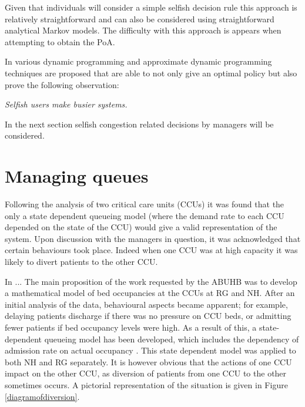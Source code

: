 \documentclass[a4paper,11pt]{article}
\begin{document}
Given that individuals will consider a simple selfish decision rule this approach is relatively straightforward and can also be considered using straightforward analytical Markov models.
The difficulty with this approach is appears when attempting to obtain the PoA.

In \cite{Shone2014} various dynamic programming and approximate dynamic programming techniques are proposed that are able to not only give an optimal policy but also prove the following observation:

\begin{center}
\textit{Selfish users make busier systems.}
\end{center}

In the next section selfish congestion related decisions by managers will be considered.

\section{Managing queues}\label{sec:managingqueues}

Following the analysis of two critical care units (CCUs) it was found that the only a state dependent queueing model (where the demand rate to each CCU depended on the state of the CCU) would give a valid representation of the system.
Upon discussion with the managers in question, it was acknowledged that certain behaviours took place.
Indeed when one CCU was at high capacity it was likely to divert patients to the other CCU.

In ...
The main proposition of the work requested by the ABUHB was to develop a mathematical model of bed occupancies at the CCUs at RG and NH.
After an initial analysis of the data, behavioural aspects became apparent; for example, delaying patients discharge if there was no pressure on CCU beds, or admitting fewer patients if bed occupancy levels were high.
As a result of this, a state-dependent queueing model has been developed, which includes the dependency of admission rate on actual occupancy \cite{Komenda2013}.
This state dependent model was applied to both NH and RG separately.
It is however obvious that the actions of one CCU impact on the other CCU, as diversion of patients from one CCU to the other sometimes occurs.
A pictorial representation of the situation is given in Figure \ref{diagramofdiversion}.
\end{document}
